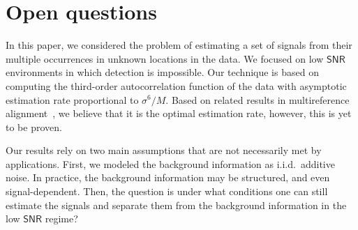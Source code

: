 \documentclass[english,11pt]{article}
\numberwithin{equation}{section}
\theoremstyle{plain}
\theoremstyle{definition}
\theoremstyle{remark}
\theoremstyle{plain}
\theoremstyle{remark}
\theoremstyle{plain}
\theoremstyle{plain}
\newcommand{\SNR}{{\textsf{SNR}}}
\begin{document}
%
%
% 

\section{Open questions}

In this paper, we considered the problem of estimating a set of signals from their multiple occurrences in unknown locations in the data.  We focused on  low $\SNR$ environments in which detection is impossible. 
Our technique  is based on computing the third-order autocorrelation function of the data with asymptotic estimation rate proportional to $\sigma^6/M$. Based on related results in multireference alignment~\cite{abbe2018estimation}, we believe that it is the optimal estimation rate, however, this is yet to be proven.

Our results rely on two main assumptions that are not necessarily met by applications. 
First, we modeled the background information as i.i.d.\ additive noise. In practice,
the background information may be structured, and even signal-dependent. Then, the question is  under what conditions  
one can still estimate the signals and separate them from the background information in the low $\SNR$ regime? 
\end{document}
